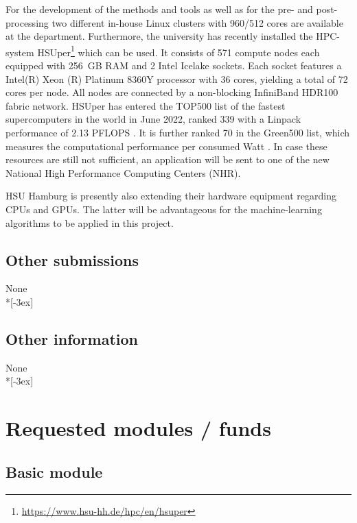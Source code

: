 \documentclass[11pt,a4paper,twoside]{scrartcl}
\begin{document}
For the development of the methods and tools as well as for the pre-
and post-processing two different in-house Linux clusters with 960/512
cores are available at the department. Furthermore, the university has
recently installed the HPC-system
HSUper\footnote[2]{\url{https://www.hsu-hh.de/hpc/en/hsuper}} which
can be used. It consists of 571 compute nodes each equipped with
256~GB RAM and 2 Intel Icelake sockets.  Each socket features a
Intel(R) Xeon (R) Platinum 8360Y processor with 36 cores, yielding a
total of 72 cores per node. All nodes are connected by a non-blocking
InfiniBand HDR100 fabric network. HSUper has entered the TOP500 list
of the fastest supercomputers in the world in June 2022, ranked 339
with a Linpack performance of 2.13 PFLOPS \citep{top500}. It is
further ranked 70 in the Green500 list, which measures the
computational performance per consumed Watt \citep{dtec2022b}. In case
these resources are still not sufficient, an application will be sent
to one of the new National High Performance Computing Centers (NHR).

HSU Hamburg is presently also extending their hardware equipment
regarding CPUs and GPUs. The latter will be advantageous for the
machine-learning algorithms to be applied in this project.

\subsection{Other submissions}
\qquad \quad None \\*[-3ex]
\subsection{Other information}
\qquad \quad None \\*[-3ex]
\pagebreak
\section{Requested modules / funds}

\subsection{Basic module}
\end{document}
